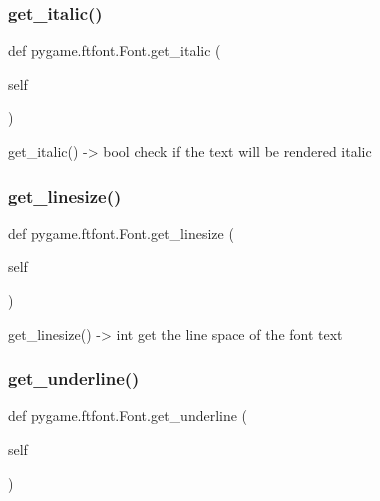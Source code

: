 \subsubsection{\texorpdfstring{get\+\_\+italic()}{get\_italic()}}
{\footnotesize\ttfamily def pygame.\+ftfont.\+Font.\+get\+\_\+italic (\begin{DoxyParamCaption}\item[{}]{self }\end{DoxyParamCaption})}

\begin{DoxyVerb}get_italic() -> bool
   check if the text will be rendered italic\end{DoxyVerb}
 \mbox{\label{classpygame_1_1ftfont_1_1_font_a1e7c33d760f2ca60fff03d51183d9695}} 
\subsubsection{\texorpdfstring{get\+\_\+linesize()}{get\_linesize()}}
{\footnotesize\ttfamily def pygame.\+ftfont.\+Font.\+get\+\_\+linesize (\begin{DoxyParamCaption}\item[{}]{self }\end{DoxyParamCaption})}

\begin{DoxyVerb}get_linesize() -> int
   get the line space of the font text\end{DoxyVerb}
 \mbox{\label{classpygame_1_1ftfont_1_1_font_a52b45e40fb7e9c11f8ca6b992603d872}} 
\subsubsection{\texorpdfstring{get\+\_\+underline()}{get\_underline()}}
{\footnotesize\ttfamily def pygame.\+ftfont.\+Font.\+get\+\_\+underline (\begin{DoxyParamCaption}\item[{}]{self }\end{DoxyParamCaption})}

